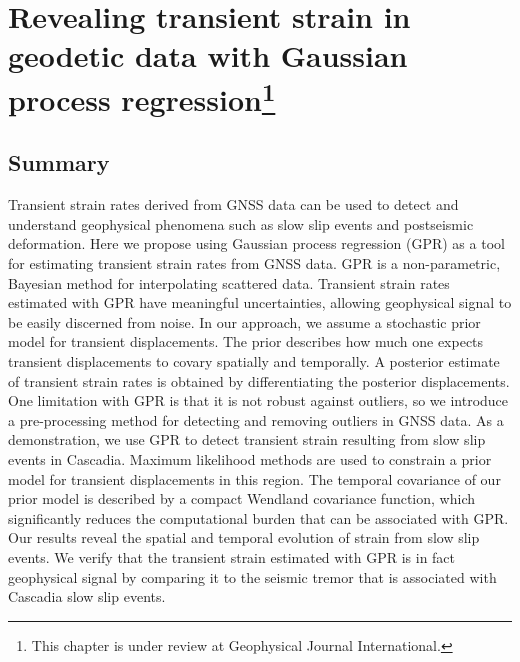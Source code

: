\chapter
[Revealing transient strain in geodetic data with Gaussian
process regression]
{Revealing transient strain in geodetic data with Gaussian
process regression\footnote[2]{
This chapter is under review at Geophysical Journal International.}}


\section{Summary}
Transient strain rates derived from GNSS data can be used to detect
and understand geophysical phenomena such as slow slip events and
postseismic deformation. Here we propose using Gaussian process
regression (GPR) as a tool for estimating transient strain rates from
GNSS data. GPR is a non-parametric, Bayesian method for interpolating
scattered data. Transient strain rates estimated with GPR have
meaningful uncertainties, allowing geophysical signal to be easily
discerned from noise. In our approach, we assume a stochastic prior
model for transient displacements. The prior describes how much one
expects transient displacements to covary spatially and temporally. A
posterior estimate of transient strain rates is obtained by
differentiating the posterior displacements. One limitation with GPR
is that it is not robust against outliers, so we introduce a
pre-processing method for detecting and removing outliers in GNSS
data. As a demonstration, we use GPR to detect transient strain
resulting from slow slip events in Cascadia. Maximum likelihood
methods are used to constrain a prior model for transient
displacements in this region. The temporal covariance of our prior
model is described by a compact Wendland covariance function, which
significantly reduces the computational burden that can be associated
with GPR. Our results reveal the spatial and temporal evolution of
strain from slow slip events. We verify that the transient strain
estimated with GPR is in fact geophysical signal by comparing it to
the seismic tremor that is associated with Cascadia slow slip events.

